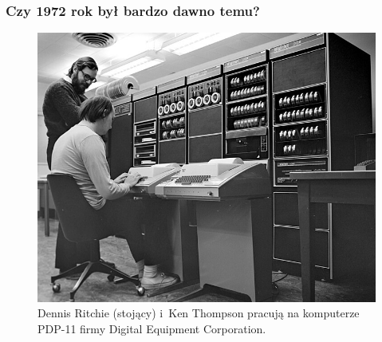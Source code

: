 \documentclass[10pt,t]{beamer}
\begin{document}
\begin{frame}
  \frametitle{Czy 1972 rok był bardzo dawno temu?}


    \begin{figure}

    \centering


    \includegraphics[scale=0.3]
    {./PresentationsPictures/Meeting-01/Dennis-Ritchie-Ken-Thompson-PDP-11.jpg}

    \caption{Dennis Ritchie (stojący) i~Ken Thompson pracują na komputerze
      PDP-11 firmy Digital Equipment Corporation.}

    \label{fig:Ritchie-Thompson-PDP-11}

  \end{figure}

\end{frame}
\end{document}
